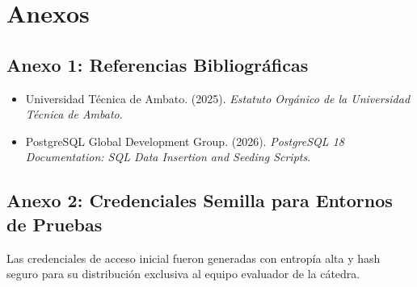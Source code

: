 \documentclass[12pt,a4paper]{article}
\begin{document}
\vspace{0.4cm}

\section{Anexos}

\subsection*{Anexo 1: Referencias Bibliográficas}
\begin{itemize}[leftmargin=1.5em, itemsep=2pt]
    \item Universidad Técnica de Ambato. (2025). \textit{Estatuto Orgánico de la Universidad Técnica de Ambato}.
    \item PostgreSQL Global Development Group. (2026). \textit{PostgreSQL 18 Documentation: SQL Data Insertion and Seeding Scripts}.
\end{itemize}

\subsection*{Anexo 2: Credenciales Semilla para Entornos de Pruebas}
Las credenciales de acceso inicial fueron generadas con entropía alta y hash seguro para su distribución exclusiva al equipo evaluador de la cátedra.
\end{document}
